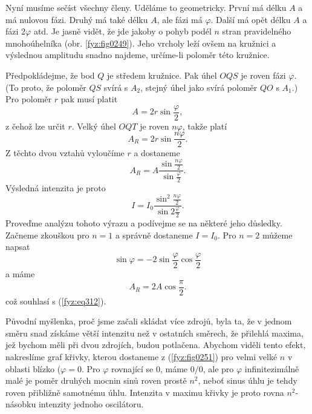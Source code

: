     Nyní musíme sečíst všechny členy. Uděláme to geometricky. První má délku \(A\) a má nulovou 
    fázi. Druhý má také délku \(A\), ale fázi má \(\varphi\). Další má opět délku \(A\) a fázi
    \(2\varphi\) atd. Je jasně vidět, že jde jakoby o pohyb podél \(n\) stran pravidelného 
    mnohoúhelníka (obr. \ref{fyz:fig0249}). Jeho vrcholy leží ovšem na kružnici a výslednou 
    amplitudu snadno najdeme, určíme-li poloměr této kružnice.
    
    Předpokládejme, že bod \(Q\) je středem kružnice. Pak úhel \(OQS\) je roven fázi \(\varphi\). 
    (To proto, že poloměr \(QS\) svírá s \(A_2\), stejný úhel jako svírá poloměr \(QO\) s \(A_1\).) 
    Pro poloměr \(r\) pak musí platit
    \begin{equation}\label{fyz:eq317}
      A = 2r\sin\frac{\varphi}{2},
    \end{equation}
    z čehož lze určit \(r\). Velký úhel \(OQT\) je roven \(n\varphi\), takže platí
    \begin{equation}\label{fyz:eq318}
      A_R = 2r\sin\frac{n\varphi}{2}.
    \end{equation}
    Z těchto dvou vztahů vyloučíme \(r\) a dostaneme 
    \begin{equation}\label{fyz:eq319}
      A_R = A\dfrac{\sin\frac{n\varphi}{2}}{\sin\frac{\varphi}{2}}.
    \end{equation}
    Výsledná intenzita je proto
    \begin{equation}\label{fyz:eq320}
      I = I_0\dfrac{\sin^2\frac{n\varphi}{2}}{\sin2\frac{\varphi}{2}}.
    \end{equation}
    Proveďme analýzu tohoto výrazu a podívejme se na některé jeho důsledky. Začneme zkouškou pro 
    \(n = 1\) a správně dostaneme \(I = I_0\). Pro \(n = 2\) můžeme napsat 
    \begin{equation*}
      \sin\varphi = -2\sin\frac{\varphi}{2}\cos\frac{\varphi}{2}
    \end{equation*}
    a máme
    \begin{equation*}
      A_R = 2A\cos\frac{\pi}{2}.
    \end{equation*}
    což souhlasí s (\ref{fyz:eq312}).
    
    Původní myšlenka, proč jsme začali skládat více zdrojů, byla ta, že v jednom směru snad získáme 
    větší intenzitu než v ostatních směrech, že přilehlá maxima, jež bychom měli při dvou zdrojích, 
    budou potlačena. Abychom viděli tento efekt, nakreslíme graf křivky, kterou dostaneme z 
    (\ref{fyz:fig0251}) pro velmi velké \(n\) v oblasti blízko (\(\varphi = 0\). Pro \(\varphi\) 
    rovnající se \(0\), máme \(0/0\), ale pro \(\varphi\) infinitezimálně malé je poměr druhých 
    mocnin sinů roven prostě \(n^2\), neboť sinus úhlu je tehdy roven přibližně samotnému úhlu. 
    Intenzita v maximu křivky je proto rovna \(n^2\)-násobku intenzity jednoho oscilátoru.
     
